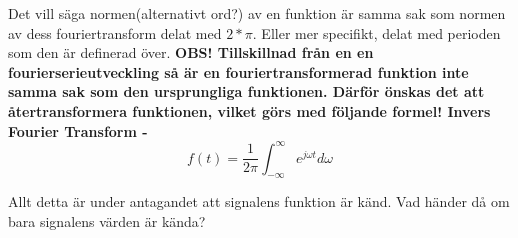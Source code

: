 \documentclass{article}
\begin{document}
Det vill säga normen(alternativt ord?) av en funktion är samma sak som normen av dess fouriertransform delat med $2*\pi$. Eller mer specifikt, delat med perioden som den är definerad över. %
\bf{OBS!} Tillskillnad från en en fourierserieutveckling så är en fouriertransformerad funktion \bf{inte} samma sak som den ursprungliga funktionen. Därför önskas det att återtransformera funktionen, vilket görs med följande formel! \newline
Invers Fourier Transform - 
$$f(t) = \frac{1}{2 \pi} \int_{-\infty}^{\infty}  e^{j \omega t} d\omega $$

Allt detta är under antagandet att signalens funktion är känd. Vad händer då om bara signalens värden är kända?
\end{document}
